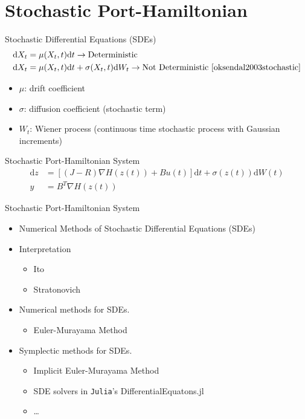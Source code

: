 \section{Stochastic Port-Hamiltonian}

\begin{frame}{Stochastic Differential Equations (SDEs)}
    \begin{align*}
        \text{d}X_t &= \mu(X_t,t)\text{d}t \rightarrow \text{Deterministic}\\
        \text{d}X_t &= \mu(X_t,t)\text{d}t + \sigma(X_t,t)\text{d}W_t \rightarrow \text{Not Deterministic \cite{oksendal2003stochastic}} 
    \end{align*}
    \begin{itemize}
        \item $\mu$: drift coefficient
        \item $\sigma$: diffusion coefficient (stochastic term)
        \item $W_t$: Wiener process (continuous time stochastic process with Gaussian increments) 
    \end{itemize}
\end{frame}

\begin{frame}{Stochastic Port-Hamiltonian System}
    \begin{align*}
        \text{d}z &= [(J-R)\nabla H(z(t)) + Bu(t)]\text{d}t + \sigma(z(t))\text{d}W(t) \\
        y &= B^T\nabla H(z(t))
    \end{align*}
\end{frame}

\begin{frame}{Stochastic Port-Hamiltonian System}
    \begin{itemize}
        \item Numerical Methods of Stochastic Differential Equations (SDEs)
        \item Interpretation
        \begin{itemize}
            \item Ito
            \item Stratonovich
        \end{itemize}
        \item Numerical methods for SDEs.
        \begin{itemize}
            \item Euler-Murayama Method
        \end{itemize}
        \item Symplectic methods for SDEs.
        \begin{itemize}
            \item Implicit Euler-Murayama Method
            \item SDE solvers in \texttt{Julia}'s DifferentialEquatons.jl
            \item \dots 
        \end{itemize}
    \end{itemize}
\end{frame}


